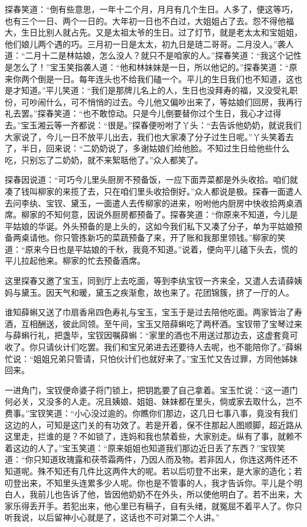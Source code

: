 探春笑道：``倒有些意思，一年十二个月，月月有几个生日。人多了，便这等巧，也有三个一日、两个一日的。大年初一日也不白过，大姐姐占了去。怨不得他福大，生日比别人就占先。又是太祖太爷的生日。过了灯节，就是老太太和宝姐姐，他们娘儿两个遇的巧。三月初一日是太太，初九日是琏二哥哥。二月没人。''袭人道：``二月十二是林姑娘，怎么没人？就只不是咱家的人。''探春笑道：``我这个记性是怎么了！''宝玉笑指袭人道：``他和林妹妹是一日，所以他记的。''探春笑道：``原来你两个倒是一日。每年连头也不给我们磕一个。平儿的生日我们也不知道，这也是才知道。''平儿笑道：``我们是那牌儿名上的人，生日也没拜寿的福，又没受礼职份，可吵闹什么，可不悄悄的过去。今儿他又偏吵出来了，等姑娘们回房，我再行礼去罢。''探春笑道：``也不敢惊动。只是今儿倒要替你过个生日，我心才过得去。''宝玉湘云等一齐都说：``很是。''探春便吩咐了丫头：``去告诉他奶奶，就说我们大家说了，今儿一日不放平儿出去，我们也大家凑了分子过生日呢。''丫头笑着去了，半日，回来说：``二奶奶说了，多谢姑娘们给他脸。不知过生日给他些什么吃，只别忘了二奶奶，就不来絮聒他了。''众人都笑了。

探春因说道：``可巧今儿里头厨房不预备饭，一应下面弄菜都是外头收拾。咱们就凑了钱叫柳家的来揽了去，只在咱们里头收拾倒好。''众人都说是极。探春一面遣人去问李纨、宝钗、黛玉，一面遣人去传柳家的进来，吩咐他内厨房中快收拾两桌酒席。柳家的不知何意，因说外厨房都预备了。探春笑道：``你原来不知道，今儿是平姑娘的华诞。外头预备的是上头的，这如今我们私下又凑了分子，单为平姑娘预备两桌请他。你只管拣新巧的菜蔬预备了来，开了账和我那里领钱。''柳家的笑道：``原来今日也是平姑娘的千秋，我竟不知道。''说着，便向平儿磕下头去，慌的平儿拉起他来。柳家的忙去预备酒席。

这里探春又邀了宝玉，同到厅上去吃面，等到李纨宝钗一齐来全，又遣人去请薛姨妈与黛玉。因天气和暖，黛玉之疾渐愈，故也来了。花团锦簇，挤了一厅的人。

谁知薛蝌又送了巾扇香帛四色寿礼与宝玉，宝玉于是过去陪他吃面。两家皆治了寿酒，互相酬送，彼此同领。至午间，宝玉又陪薛蝌吃了两杯酒。宝钗带了宝琴过来与薛蝌行礼，把盏毕，宝钗因嘱薛蝌：``家里的酒也不用送过那边去，这虚套竟可收了。你只请伙计们吃罢。我们和宝兄弟进去还要待人去呢，也不能陪你了。''薛蝌忙说：``姐姐兄弟只管请，只怕伙计们也就好来了。''宝玉忙又告过罪，方同他姊妹回来。

一进角门，宝钗便命婆子将门锁上，把钥匙要了自己拿着。宝玉忙说：``这一道门何必关，又没多的人走。况且姨娘、姐姐、妹妹都在里头，倘或家去取什么，岂不费事。''宝钗笑道：``小心没过逾的。你瞧你们那边，这几日七事八事，竟没有我们这边的人，可知是这门关的有功效了。若是开着，保不住那起人图顺脚，超近路从这里走，拦谁的是？不如锁了，连妈和我也禁着些，大家别走。纵有了事，就赖不着这边的人了。''宝玉笑道：``原来姐姐也知道我们那边近日丢了东西？''宝钗笑道：``你只知道玫瑰露和茯苓霜两件，乃因人而及物。若非因人，你连这两件还不知道呢。殊不知还有几件比这两件大的呢。若以后叨登不出来，是大家的造化；若叨登出来，不知里头连累多少人呢。你也是不管事的人，我才告诉你。平儿是个明白人，我前儿也告诉了他，皆因他奶奶不在外头，所以使他明白了。若不出来，大家乐得丢开手。若犯出来，他心里已有稿子，自有头绪，就冤屈不着平人了。你只听我说，以后留神小心就是了，这话也不可对第二个人讲。''

